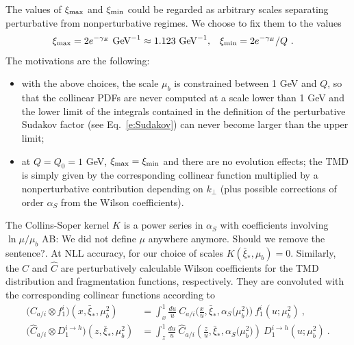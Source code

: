 \documentclass[aps,preprintnumbers,showpacs,nofootinbib,superscriptaddress,floatfix]{revtex4}
\newcommand{\AS}[1]{{\textcolor[rgb]{1,0,1}{#1}}}
\newcommand{\T}{\perp}
\newcommand{\bb}{\xi}
\begin{document}
The values of $\bb_{\rm max}$ and
$\bb_{\rm min}$ could
be regarded as arbitrary scales separating perturbative from nonperturbative
regimes. 
We choose to fix them to the
values 
\begin{align}
\bb_{\rm max} &= 2 e^{-\gamma_E}  \text{  GeV}^{-1} \approx 1.123 \text{  GeV}^{-1}, 
&
\bb_{\rm min} &= 2 e^{-\gamma_E}/Q \ .
\label{e:bminmax}
\end{align} 
The motivations are the following: 
\begin{itemize}
\item{} with the above choices, the scale $\mu_b$ is
  constrained between 1 GeV and $Q$, so that the collinear PDFs are never
  computed at a scale lower than 1 GeV and the lower limit of the integrals
  contained in the definition of the perturbative Sudakov factor (see
  Eq.~\eqref{e:Sudakov})  can never
  become larger than the upper limit;
\item{} at $Q=Q_0 = 1$ GeV, $\bb_{\rm max} = \bb_{\rm min}$ and there are no evolution effects; the TMD is
simply given by the corresponding collinear function multiplied by a
nonperturbative contribution depending on $k_\T$ (plus possible corrections of
order $\alpha_S$ from the Wilson coefficients).
\end{itemize} 

The Collins-Soper kernel $K$ is a power series in $\alpha_S$ with coefficients
involving $\ln \mu/\mu_b$ \AS{AB: We did not define $\mu$ anywhere anymore. Should
we remove the sentence?}. 
At NLL accuracy, for our choice of scales $K(\bar{\bb}_{\ast},\mu_b) =
0$. 
Similarly, the $C$ and $\hat{C}$ are perturbatively calculable Wilson
coefficients for 
the TMD distribution and fragmentation functions, respectively. They are
convoluted with the corresponding collinear functions according to 
\begin{align}
\bigl( C_{a/i} \otimes f_1^i \bigr) (x, \bar{\bb}_\ast, \mu_b^2) &=
  \int_x^1 \frac{du}{u}\  
        C_{a/i} \Big( \frac{x}{u}, \bar{\bb}_\ast, \alpha_S\big(\mu_b^2\big)  \Big) \  
        f_1^i (u; \mu_b^2) \  , 
\label{e:WC1} \\
\bigl( \hat{C}_{a/i} \otimes D_1^{i\to h} \bigr) (z, \bar{\bb}_\ast, \mu_b^2) &= \int_z^1 \frac{du}{u}\  \hat{C}_{a/i} \left( \frac{z}{u}, \bar{\bb}_\ast, \alpha_S\big(\mu_b^2\big) \right) \  D_1^{i\to h} (u; \mu_b^2) \  . 
\label{e:WC2}
\end{align}
\end{document}

